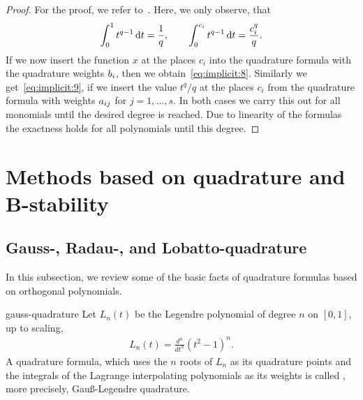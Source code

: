 


\begin{proof}
  For the proof, we refer to~\cite[Ch. II, Theorem
  7.4]{HairerNorsettWanner93}. Here, we only observe, that
  \begin{gather*}
    \int_0^1 t^{q-1} \,\mathrm{d} t = \frac1{q}, \qquad
    \int_0^{c_i} t^{q-1} \,\mathrm{d} t = \frac{c_i^{q}}{q}.
  \end{gather*}
  If we now insert the function $x$ at the places $c_i$ into the
  quadrature formula with the quadrature weights $b_i$, then we
  obtain~\eqref{eq:implicit:8}. Similarly we get~\eqref{eq:implicit:9}, if we insert the value $t^{q}/q$ at
  the places $c_i$ from the quadrature formula with weights
  $a_{ij}$ for $j=1,\dots,s$. In both cases we carry this out for
  all monomials until the desired degree is reached.  Due to linearity
  of the formulas the exactness holds for all polynomials until this
  degree.
\end{proof}

\section{Methods based on quadrature and B-stability}

\subsection{Gauss-, Radau-, and Lobatto-quadrature}

\begin{intro}
  In this subsection, we review some of the basic facts of quadrature
  formulas based on orthogonal polynomials.
\end{intro}

\begin{Definition}{gauss-quadrature}
  Let $L_n(t)$ be the Legendre polynomial of degree $n$ on $[0,1]$, up
  to scaling,
  \begin{gather*}
    L_n(t) = \frac{d^{n}}{dt^{n}}(t^2-1)^{n}.
  \end{gather*}
  A quadrature formula, which uses the $n$ roots of $L_n$ as its
  quadrature points and the integrals of the Lagrange interpolating
  polynomials as its weights is called , more
  precisely, Gauß-Legendre quadrature.
\end{Definition}

